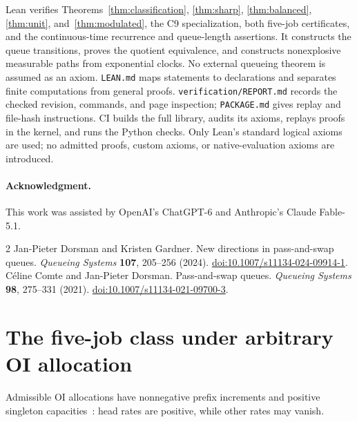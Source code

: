 \documentclass[11pt]{article}
\theoremstyle{remark}
\begin{document}
Lean verifies Theorems~\ref{thm:classification}, \ref{thm:sharp}, \ref{thm:balanced}, \ref{thm:unit}, and~\ref{thm:modulated}, the C9 specialization, both five-job certificates, and the continuous-time recurrence and queue-length assertions. It constructs the queue transitions, proves the quotient equivalence, and constructs nonexplosive measurable paths from exponential clocks. No external queueing theorem is assumed as an axiom. \texttt{LEAN.md} maps statements to declarations and separates finite computations from general proofs. \texttt{verification/REPORT.md} records the checked revision, commands, and page inspection; \texttt{PACKAGE.md} gives replay and file-hash instructions. CI builds the full library, audits its axioms, replays proofs in the kernel, and runs the Python checks. Only Lean's standard logical axioms are used; no admitted proofs, custom axioms, or native-evaluation axioms are introduced.

\paragraph{Acknowledgment.} This work was assisted by OpenAI's ChatGPT-6 and Anthropic's Claude Fable-5.1.

\begin{thebibliography}{2}
 Jan-Pieter Dorsman and Kristen Gardner.
\newblock New directions in pass-and-swap queues.
\newblock \emph{Queueing Systems} \textbf{107}, 205--256 (2024).
\newblock \href{https://doi.org/10.1007/s11134-024-09914-1}{doi:10.1007/s11134-024-09914-1}.
 C{\'e}line Comte and Jan-Pieter Dorsman.
\newblock Pass-and-swap queues.
\newblock \emph{Queueing Systems} \textbf{98}, 275--331 (2021).
\newblock \href{https://doi.org/10.1007/s11134-021-09700-3}{doi:10.1007/s11134-021-09700-3}.
\end{thebibliography}

\appendix
\section{The five-job class under arbitrary OI allocation}\label{app:head}
Admissible OI allocations have nonnegative prefix increments and positive singleton capacities~\cite[Definition~1, p.~210]{DG}: head rates are positive, while other rates may vanish.
\end{document}
